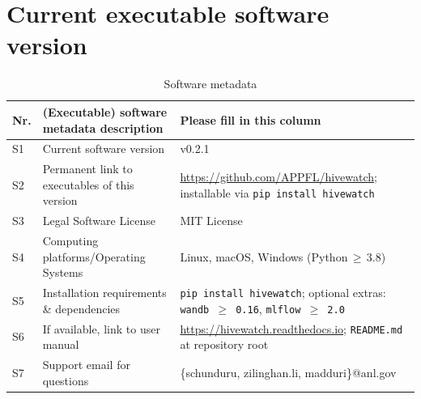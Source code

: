 \documentclass[preprint,12pt, a4paper]{elsarticle}
\begin{document}



\section*{Current executable software version}
\label{}

\begin{table}[!h]
\begin{tabular}{|l|p{4.5cm}|p{7.5cm}|}
\hline
\textbf{Nr.} & \textbf{(Executable) software metadata description} & \textbf{Please fill in this column} \\
\hline
S1 & Current software version & v0.2.1 \\
\hline
S2 & Permanent link to executables of this version & \url{https://github.com/APPFL/hivewatch}; installable via \texttt{pip install hivewatch} \\
\hline
S3 & Legal Software License & MIT License \\
\hline
S4 & Computing platforms/Operating Systems & Linux, macOS, Windows (Python\,$\geq$\,3.8) \\
\hline
S5 & Installation requirements \& dependencies & \texttt{pip install hivewatch}; optional extras: \texttt{wandb\,$\geq$\,0.16}, \texttt{mlflow\,$\geq$\,2.0} \\
\hline
S6 & If available, link to user manual & \url{https://hivewatch.readthedocs.io}; \texttt{README.md} at repository root \\
\hline
S7 & Support email for questions & \{schunduru, zilinghan.li, madduri\}@anl.gov \\
\hline
\end{tabular}
\caption{Software metadata}
\label{tab:softwaremeta}
\end{table}
\end{document}

